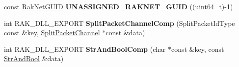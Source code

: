 \begin{DoxyCompactItemize}
\item 
\hypertarget{namespace_rak_net_a8137eff86673d466e6e6e7c69ea5482a}{const \hyperlink{struct_rak_net_1_1_rak_net_g_u_i_d}{Rak\-Net\-G\-U\-I\-D} {\bfseries U\-N\-A\-S\-S\-I\-G\-N\-E\-D\-\_\-\-R\-A\-K\-N\-E\-T\-\_\-\-G\-U\-I\-D} ((uint64\-\_\-t)-\/1)}\label{namespace_rak_net_a8137eff86673d466e6e6e7c69ea5482a}

\item 
\hypertarget{namespace_rak_net_a059ad51d029f78bfd61a7f6d367f14f6}{int R\-A\-K\-\_\-\-D\-L\-L\-\_\-\-E\-X\-P\-O\-R\-T {\bfseries Split\-Packet\-Channel\-Comp} (Split\-Packet\-Id\-Type const \&key, \hyperlink{struct_rak_net_1_1_split_packet_channel}{Split\-Packet\-Channel} $\ast$const \&data)}\label{namespace_rak_net_a059ad51d029f78bfd61a7f6d367f14f6}

\item 
\hypertarget{namespace_rak_net_a08703ea73b0add3cd54b8b5a897006b5}{int R\-A\-K\-\_\-\-D\-L\-L\-\_\-\-E\-X\-P\-O\-R\-T {\bfseries Str\-And\-Bool\-Comp} (char $\ast$const \&key, const \hyperlink{struct_str_and_bool}{Str\-And\-Bool} \&data)}\label{namespace_rak_net_a08703ea73b0add3cd54b8b5a897006b5}

\end{DoxyCompactItemize}
